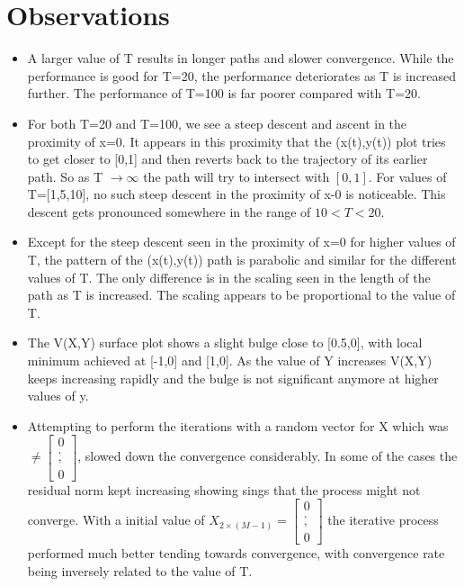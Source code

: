 \documentclass[twoside,12pt]{article}
\begin{document}
\section{Observations}
\label{observations}
\begin{itemize}
\item
A larger value of T results in longer paths and slower convergence. While the performance is good for T=20, the performance deteriorates as T is increased further. The performance of T=100 is far poorer compared with T=20.
\item
For both T=20 and T=100, we see a steep descent and ascent in the proximity of x=0. It appears in this proximity that the (x(t),y(t)) plot tries to get closer to [0,1] and then reverts back to the trajectory of its earlier path. So as T $\rightarrow \infty$ the path will try to intersect with $[0,1]$. For values of T=[1,5,10], no such steep descent in the proximity of x-0 is noticeable. This descent gets pronounced somewhere in the range of $10<T<20$. 
\item
Except for the steep descent seen in the proximity of x=0 for higher values of T, the pattern of the (x(t),y(t)) path is parabolic and similar for the different values of T. The only difference is in the scaling seen in the length of the path as T is increased. The scaling appears to be proportional to the value of T.
\item
The V(X,Y) surface plot shows a slight bulge close to [0.5,0], with local minimum achieved at [-1,0] and [1,0]. As the value of Y increases V(X,Y) keeps increasing rapidly and the bulge is not significant anymore at higher values of y.
\item
Attempting to perform the iterations with a random vector for X which was $\ne  \begin{bmatrix}0\\.\\,\\0\end{bmatrix}$, slowed down the convergence considerably. In some of the cases the residual norm kept increasing showing sings that the process might not converge. With a initial value of $X_{2\times(M-1)} = \begin{bmatrix}0\\.\\,\\0\end{bmatrix}$ the iterative process performed much better tending towards convergence, with convergence rate being inversely related to the value of T.
\end{itemize}
\end{document}
